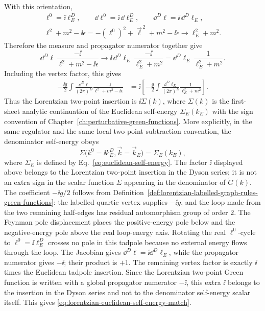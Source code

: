 With this orientation,
\[
\begin{gathered}
  \ell^0=\ii\ell_E^D,\qquad
  \dd\ell^0=\ii\,\dd\ell_E^D,\qquad
  \dd^D\ell=\ii\,\dd^D\ell_E,\\
  \ell^2+m^2-\ii\epsilon
  =
  -(\ell^0)^2+\vec\ell^{\,2}+m^2-\ii\epsilon
  \longrightarrow
  \ell_E^2+m^2 .
\end{gathered}
\]
Therefore the measure and propagator numerator together give
\[
  \dd^D\ell\,\frac{-\ii}{\ell^2+m^2-\ii\epsilon}
  \longrightarrow
  \ii\,\dd^D\ell_E\,\frac{-\ii}{\ell_E^2+m^2}
  =
  \dd^D\ell_E\,\frac{1}{\ell_E^2+m^2}.
\]
Including the vertex factor, this gives
\[
\begin{aligned}
  -\frac{\ii g}{2}
  \int \frac{\dd^D\ell}{(2\pi)^D}
  \frac{-\ii}{\ell^2+m^2-\ii\epsilon}
  &=
  \ii\left[
    -\frac{g}{2}
    \int \frac{\dd^D\ell_E}{(2\pi)^D}
    \frac{1}{\ell_E^2+m^2}
  \right].
\end{aligned}
\]
Thus the Lorentzian two-point insertion is \(\ii\Sigma(k)\), where
\(\Sigma(k)\) is the first-sheet analytic continuation of the Euclidean
self-energy \(\Sigma_E(k_E)\) with the sign convention of
Chapter~\ref{ch:perturbative-green-functions}.
More explicitly, in the same regulator and the same local two-point
subtraction convention, the denominator self-energy obeys
\begin{equation}
  \Sigma\bigl(k^0=\ii k_E^D,\vec k=\vec k_E\bigr)
  =
  \Sigma_E(k_E),
  \label{eq:lorentzian-euclidean-self-energy-match}
\end{equation}
where \(\Sigma_E\) is defined by
Eq.~\eqref{eq:euclidean-self-energy}.  The factor \(\ii\) displayed above
belongs to the Lorentzian two-point insertion in the Dyson series; it is not an
extra sign in the scalar function \(\Sigma\) appearing in the denominator of
\(\widetilde G(k)\).
The coefficient \(-\ii g/2\) follows from
Definition~\ref{def:lorentzian-labelled-graph-rules-green-functions}: the
labelled quartic vertex supplies \(-\ii g\), and the loop made from the two
remaining half-edges has residual automorphism group of order \(2\).  The
Feynman pole displacement places the positive-energy pole below and the
negative-energy pole above the real loop-energy axis.  Rotating the real
\(\ell^0\)-cycle to \(\ell^0=\ii\ell_E^D\) crosses no pole in this tadpole
because no external energy flows through the loop.  The Jacobian gives
\(\dd^D\ell=\ii\dd^D\ell_E\), while the propagator numerator gives
\(-\ii\); their product is \(+1\).  The remaining vertex factor is exactly
\(\ii\) times the Euclidean tadpole insertion.  Since the Lorentzian
two-point Green function is written with a global propagator numerator
\(-\ii\), this extra \(\ii\) belongs to the insertion in the Dyson series and
not to the denominator self-energy scalar itself.  This gives
\eqref{eq:lorentzian-euclidean-self-energy-match}.

